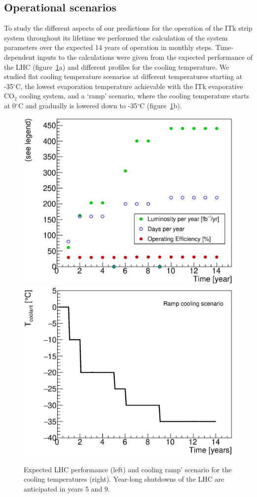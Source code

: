 
\subsection{Operational scenarios}\label{sec:opscenarios}
To study the different aspects of our predictions for the operation of the ITk strip system throughout its lifetime we performed the calculation of the system parameters over the expected 14 years of operation in monthly steps. Time-dependent inputs to the calculations were given from the expected performance of the LHC (figure~\ref{fig:opscenarios}a) and different profiles for the cooling temperature. We studied flat cooling temperature scenarios at different temperatures starting at -35$^\circ$C, the lowest evaporation temperature achievable with the ITk evaporative CO$_2$ cooling system, and a `ramp' scenario, where the cooling temperature starts at 0$^\circ$C and gradually is lowered down to -35$^\circ$C (figure~\ref{fig:opscenarios}b).

\begin{figure}[ht]
\centering
\includegraphics[width=0.49\linewidth]{figures/YearlyRunProfile.eps}
\includegraphics[width=0.49\linewidth]{figures/CoolantTemperature_RampScenario.eps}
\caption{Expected LHC performance (left) and cooling ramp' scenario for the cooling temperatures (right). Year-long shutdowns of the LHC are anticipated in years 5 and 9.}
\label{fig:opscenarios}
\end{figure}

